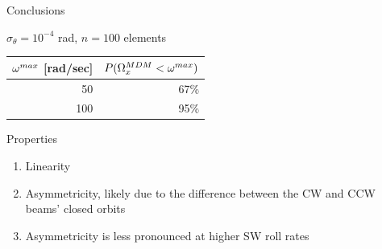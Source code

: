 \documentclass[14pt]{beamer}
\begin{document}
\begin{frame}{Conclusions}
	\begin{block}{$\sigma_\theta = 10^{-4}$ rad, $n=100$ elements}
		\begin{tabular}{r|r}
			\hline
			$\omega^{max}$ [rad/sec] & $P(\Omega_x^{MDM} < \omega^{max})$\\
			\hline
			50  & 67\%\\
			100 & 95\%\\
			\hline
		\end{tabular}
	\end{block}
	\begin{block}{Properties}
		\begin{enumerate}
			\item Linearity
			\item Asymmetricity, likely due to the difference between the CW and CCW beams' closed orbits
			\item Asymmetricity is less pronounced at higher SW roll rates
		\end{enumerate}
	\end{block}
\end{frame}
\end{document}
